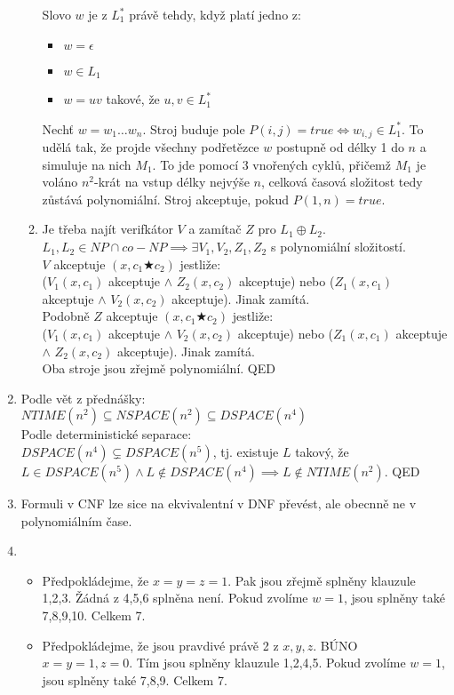 \documentclass[a4wide,8pt]{extarticle}
\begin{document}
\begin{enumerate}
\begin{enumerate}
			Slovo $w$ je z $L_1^*$ právě tehdy, když platí jedno z:
			\begin{itemize}
				\item $w=\epsilon$
				\item $w\in L_1$
				\item $w=uv$ takové, že $u,v \in L_1^*$
			\end{itemize}
			Nechť $w=w_1\dots w_n$. Stroj buduje pole $P(i,j)=true \iff w_{i,j}\in L_1^*$. To udělá tak, že projde všechny podřetězce $w$ postupně od délky 1 do $n$ a simuluje na nich $M_1$. To jde pomocí 3 vnořených cyklů, přičemž $M_1$ je voláno $n^2$-krát na vstup délky nejvýše $n$, celková časová složitost tedy zůstává polynomiální. Stroj akceptuje, pokud $P(1,n)=true$.
		\item
			Je třeba najít verifkátor $V$ a zamítač $Z$ pro $L_1\oplus L_2$. $L_1,L_2\in NP\cap co-NP\implies \exists V_1,V_2,Z_1,Z_2$ s polynomiální složitostí.\\
			$V$ akceptuje $(x,c_1\bigstar c_2)$ jestliže:\\
			($V_1(x,c_1)$ akceptuje $\wedge$ $Z_2(x,c_2)$ akceptuje) nebo ($Z_1(x,c_1)$ akceptuje $\wedge$ $V_2(x,c_2)$ akceptuje). Jinak zamítá.\\
			Podobně $Z$ akceptuje $(x,c_1\bigstar c_2)$ jestliže:\\
			($V_1(x,c_1)$ akceptuje $\wedge$ $V_2(x,c_2)$ akceptuje) nebo ($Z_1(x,c_1)$ akceptuje $\wedge$ $Z_2(x,c_2)$ akceptuje). Jinak zamítá.\\
			Oba stroje jsou zřejmě polynomiální. QED
	\end{enumerate}
	\item
		Podle vět z přednášky:\\
		$NTIME(n^2)\subseteq NSPACE(n^2)\subseteq DSPACE(n^4)$\\
		Podle deterministické separace:\\
		$DSPACE(n^4)\subsetneq DSPACE(n^5)$, tj. existuje $L$ takový, že $L\in DSPACE(n^5) \wedge L\notin DSPACE(n^4) \implies L\notin NTIME(n^2)$. QED
	\item
		Formuli v CNF lze sice na ekvivalentní v DNF převést, ale obecnně ne v polynomiálním čase.
	\item
		\begin{itemize}
			\item Předpokládejme, že $x=y=z=1$. Pak jsou zřejmě splněny klauzule 1,2,3. Žádná z 4,5,6 splněna není. Pokud zvolíme $w=1$, jsou splněny také 7,8,9,10. Celkem 7.
			\item Předpokládejme, že jsou pravdivé právě 2 z $x,y,z$. BÚNO $x=y=1, z=0$. Tím jsou splněny klauzule 1,2,4,5. Pokud zvolíme $w=1$, jsou splněny také 7,8,9. Celkem 7.

\end{itemize}
\end{enumerate}
\end{document}
